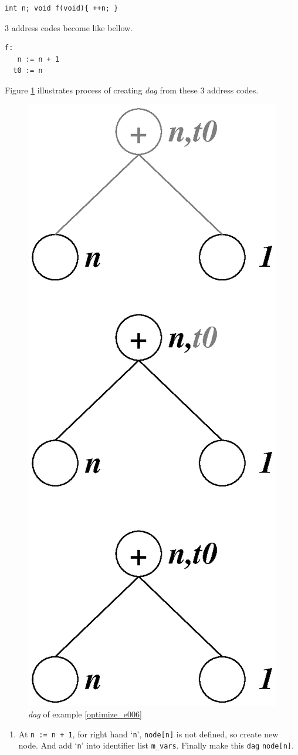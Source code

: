 \begin{Example}
\label{optimize_e006}
\begin{verbatim}
int n; void f(void){ ++n; }
\end{verbatim}
3 address codes become like bellow.
\begin{verbatim}
f:
   n := n + 1
  t0 := n
\end{verbatim}
Figure \ref{optimize_e005} illustrates
process of creating {\em dag} from these 3 address codes.
\begin{figure}[htbp]
\begin{center}
\includegraphics[width=0.5\linewidth,height=1.01\linewidth]{opt000.eps}
\caption{{\em dag} of example \ref{optimize_e006}}
\label{optimize_e005}
\end{center}
\end{figure}

\begin{enumerate}
\item At {\tt{n := n + 1}}, for right hand `{\tt{n}}', 
{\tt{node[n]}} is not defined, so create new node. And
add `{\tt{n}}' into identifier list {\tt{m\_vars}}.
Finally make this {\tt{dag}} {\tt{node[n]}}.


\end{enumerate}
\end{Example}
